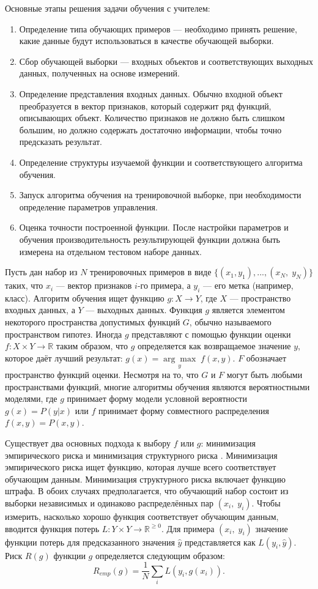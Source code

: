 Основные этапы решения задачи обучения с учителем:
\begin{enumerate}
	\item Определение типа обучающих примеров --- необходимо принять решение, какие данные будут использоваться в качестве обучающей выборки. 
	\item Сбор обучающей выборки --- входных объектов и соответствующих выходных данных, полученных на основе измерений.
	\item Определение представления входных данных. Обычно входной объект преобразуется в вектор признаков, который содержит ряд функций, описывающих объект. Количество признаков не должно быть слишком большим, но должно содержать достаточно информации, чтобы точно предсказать результат.
	\item Определение структуры изучаемой функции и соответствующего алгоритма обучения. 
	\item Запуск алгоритма обучения на тренировочной выборке, при необходимости определение параметров управления. 
	\item Оценка точности построенной функции. После настройки параметров и обучения производительность результирующей функции должна быть измерена на отдельном тестовом наборе данных.
\end{enumerate}

Пусть дан набор из $N$ тренировочных примеров в виде $\{(x_1, y_1), ..., (x_N,\; y_N)\}$ таких, что $x_{i}$ --- вектор признаков $i$-го примера, а $y_{i}$ --- его метка (например, класс). Алгоритм обучения ищет функцию $g: X \to Y$, где $X$ --- пространство входных данных, а $Y$ --- выходных данных. Функция $g$ является элементом некоторого пространства допустимых функций $G$, обычно называемого пространством гипотез. Иногда $g$ представляют с помощью функции оценки $f: X \times Y \to \mathbb{R}$ таким образом, что $g$ определяется как возвращаемое значение $y$, которое даёт лучший результат: $g(x) = {\underset{y} {\arg\max}}\; f(x, y)$. $F$ обозначает пространство функций оценки. Несмотря на то, что $G$ и $F$ могут быть любыми пространствами функций, многие алгоритмы обучения являются вероятностными моделями, где $g$ принимает форму модели условной вероятности $g(x) = P(y|x)$ или $f$ принимает форму совместного распределения $f(x, y) = P(x, y)$. 

Существует два основных подхода к выбору $f$ или $g$: минимизация эмпирического риска и минимизация структурного риска \autocite{vapnik2013nature}. Минимизация эмпирического риска ищет функцию, которая лучше всего соответствует обучающим данным. Минимизация структурного риска включает функцию штрафа. В обоих случаях предполагается, что обучающий набор состоит из выборки независимых и одинаково распределённых пар $(x_i, \; y_i)$. Чтобы измерить, насколько хорошо функция соответствует обучающим данным, вводится функция потерь $L: Y \times Y \to \mathbb {R}^{\geq 0}$. Для примера $(x_i, \; y_i)$ значение функции потерь для предсказанного значения $\hat{y}$ представляется как $L(y_i,\hat{y})$. Риск $R (g)$ функции $g$ определяется следующим образом:
\begin{equation}
\label{eq:sup_learn_loss}	
R_{emp} (g) = \frac{1}{N} \sum_i L(y_i, g(x_i)).
\end{equation}

